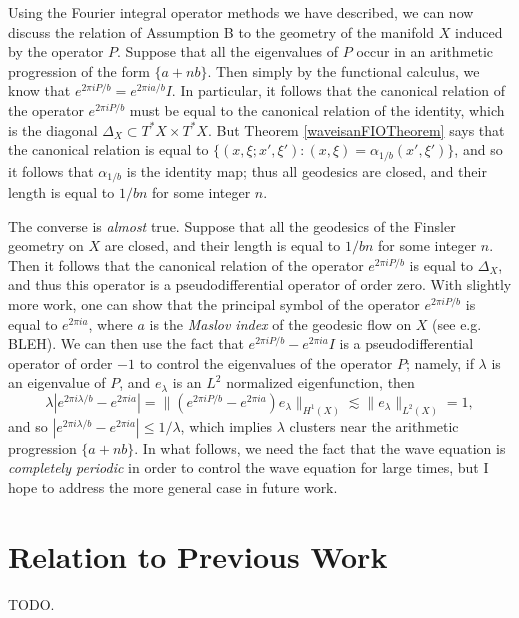 Using the Fourier integral operator methods we have described, we can now discuss the relation of Assumption B to the geometry of the manifold $X$ induced by the operator $P$. Suppose that all the eigenvalues of $P$ occur in an arithmetic progression of the form $\{ a + n b \}$. Then simply by the functional calculus, we know that $e^{2 \pi i P/b} = e^{2 \pi i a/b} I$. In particular, it follows that the canonical relation of the operator $e^{2 \pi i P/b}$ must be equal to the canonical relation of the identity, which is the diagonal $\Delta_X \subset T^* X \times T^* X$. But Theorem \ref{waveisanFIOTheorem} says that the canonical relation is equal to $\{ (x,\xi;x',\xi'): (x,\xi) = \alpha_{1/b}(x',\xi') \}$, and so it follows that $\alpha_{1/b}$ is the identity map; thus all geodesics are closed, and their length is equal to $1/bn$ for some integer $n$.

The converse is \emph{almost} true. Suppose that all the geodesics of the Finsler geometry on $X$ are closed, and their length is equal to $1/bn$ for some integer $n$. Then it follows that the canonical relation of the operator $e^{2 \pi i P/b}$ is equal to $\Delta_X$, and thus this operator is a pseudodifferential operator of order zero. With slightly more work, one can show that the principal symbol of the operator $e^{2 \pi i P/b}$ is equal to $e^{2 \pi i a}$, where $a$ is the \emph{Maslov index} of the geodesic flow on $X$ (see e.g. BLEH). We can then use the fact that $e^{2 \pi i P/b} - e^{2 \pi i a} I$ is a pseudodifferential operator of order $-1$ to control the eigenvalues of the operator $P$; namely, if $\lambda$ is an eigenvalue of $P$, and $e_\lambda$ is an $L^2$ normalized eigenfunction, then
%
\begin{equation}
  \lambda |e^{2 \pi i \lambda/b} - e^{2 \pi i a}| = \| (e^{2 \pi i P/b} - e^{2 \pi i a}) e_\lambda \|_{H^1(X)} \lesssim \| e_\lambda \|_{L^2(X)} = 1,
\end{equation}
%
and so $|e^{2 \pi i \lambda/b} - e^{2 \pi i a}| \leq 1/\lambda$, which implies $\lambda$ clusters near the arithmetic progression $\{ a + nb \}$. In what follows, we need the fact that the wave equation is \emph{completely periodic} in order to control the wave equation for large times, but I hope to address the more general case in future work.

\section{Relation to Previous Work}

TODO.